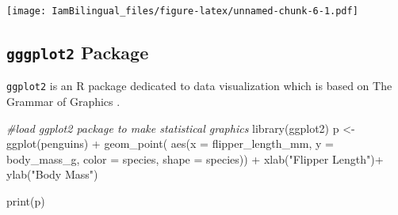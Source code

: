 \documentclass[
]{book}
\newenvironment{Shaded}{\begin{snugshade}}{\end{snugshade}}
\newcommand{\AttributeTok}[1]{\textcolor[rgb]{0.77,0.63,0.00}{#1}}
\newcommand{\CommentTok}[1]{\textcolor[rgb]{0.56,0.35,0.01}{\textit{#1}}}
\newcommand{\DecValTok}[1]{\textcolor[rgb]{0.00,0.00,0.81}{#1}}
\newcommand{\FunctionTok}[1]{\textcolor[rgb]{0.00,0.00,0.00}{#1}}
\newcommand{\NormalTok}[1]{#1}
\newcommand{\OtherTok}[1]{\textcolor[rgb]{0.56,0.35,0.01}{#1}}
\newcommand{\SpecialCharTok}[1]{\textcolor[rgb]{0.00,0.00,0.00}{#1}}
\newcommand{\StringTok}[1]{\textcolor[rgb]{0.31,0.60,0.02}{#1}}
\begin{document}
\begin{Shaded}
\end{Shaded}

\texttt{[image: IamBilingual\_files/figure-latex/unnamed-chunk-6-1.pdf]}

\hypertarget{gggplot2-package}{%
\subsection{\texorpdfstring{\texttt{gggplot2} Package}{gggplot2 Package}}\label{gggplot2-package}}

\texttt{ggplot2} is an R package dedicated to data visualization which is based on The Grammar of Graphics \citep{wilkinson2012grammar}.

\begin{Shaded}
\begin{Highlighting}[]
\CommentTok{\#load ggplot2 package to make statistical graphics}
\FunctionTok{library}\NormalTok{(ggplot2)}
\NormalTok{p }\OtherTok{\textless{}{-}} \FunctionTok{ggplot}\NormalTok{(penguins) }\SpecialCharTok{+}
  \FunctionTok{geom\_point}\NormalTok{( }\FunctionTok{aes}\NormalTok{(}\AttributeTok{x =}\NormalTok{ flipper\_length\_mm,}
                  \AttributeTok{y =}\NormalTok{ body\_mass\_g,}
                  \AttributeTok{color =}\NormalTok{ species,}
                  \AttributeTok{shape =}\NormalTok{ species)) }\SpecialCharTok{+}
  \FunctionTok{xlab}\NormalTok{(}\StringTok{"Flipper Length"}\NormalTok{)}\SpecialCharTok{+}
  \FunctionTok{ylab}\NormalTok{(}\StringTok{"Body Mass"}\NormalTok{)}

\FunctionTok{print}\NormalTok{(p)}
\end{Highlighting}
\end{Shaded}
\end{document}
